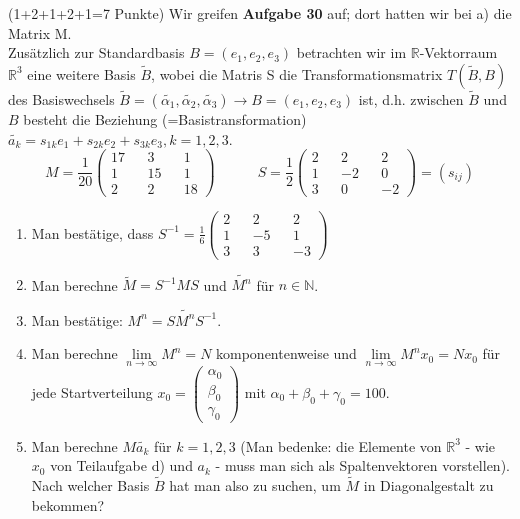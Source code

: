 \documentclass{uebblatt}
\begin{document}

\begin{aufgabe}{ (1+2+1+2+1=7 Punkte)}
Wir greifen \textbf{Aufgabe 30} auf; dort hatten wir bei a) die Matrix M. \\
Zusätzlich zur Standardbasis $B = (e_1, e_2, e_3)$ betrachten wir im $\mathbb{R}$-Vektorraum $\mathbb{R}^3$ eine weitere Basis $\widetilde{B}$, wobei die Matris S die Transformationsmatrix $T(\widetilde{B}, B)$ des Basiswechsels $\widetilde{B} = (\tilde{\alpha_1}, \tilde{\alpha_2}, \tilde{\alpha_3}) \to B = (e_1, e_2, e_3)$ ist, d.h. zwischen $\widetilde{B}$ und $B$ besteht die Beziehung (=Basistransformation) $\tilde{a_k} = s_{1k} e_1 + s_{2k} e_2 + s_{3k} e_3, k = 1, 2, 3$.
$$M = \frac{1}{20}\begin{pmatrix}
17 && 3 && 1 \\
1 && 15 && 1 \\
2 && 2 && 18 \end{pmatrix} \qquad \quad
S = \frac{1}{2}\begin{pmatrix}
2 && 2 && 2 \\
1 && -2 && 0 \\
3 && 0 && -2 \end{pmatrix} = (s_{ij})$$
\begin{enumerate}
\item Man bestätige, dass $S^{-1} = \frac{1}{6} \begin{pmatrix} 2 && 2 && 2 \\ 1 && -5 && 1 \\ 3 && 3 && -3 \end{pmatrix}$
\item Man berechne $\widetilde{M} = S^{-1}MS$ und $\widetilde{M^n}$ für $n \in \mathbb{N}$.
\item Man bestätige: $M^n = S \widetilde{M^n} S^{-1}$.
\item Man berechne $\lim \limits_{n \to \infty} M^n = N$ komponentenweise und $\lim \limits_{n \to \infty} M^n x_0 = N x_0$ für jede Startverteilung $x_0 = \begin{pmatrix} \alpha_0 \\ \beta_0 \\ \gamma_0 \end{pmatrix}$ mit $\alpha_0 + \beta_0 + \gamma_0 = 100$.
\item Man berechne $M \tilde{a_k}$ für $k = 1, 2, 3$ (Man bedenke: die Elemente von $\mathbb{R}^3$ - wie $x_0$ von Teilaufgabe d) und $a_k$ - muss man sich als Spaltenvektoren vorstellen). Nach welcher Basis $\widetilde{B}$ hat man also zu suchen, um $\widetilde{M}$ in Diagonalgestalt zu bekommen? 
\end{enumerate}
\end{aufgabe}
\end{document}
